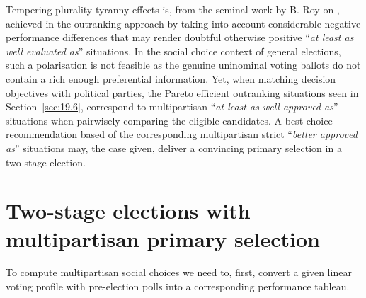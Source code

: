 Tempering plurality tyranny effects is, from the seminal work by B. Roy on \citep{ROY-1966}, achieved in the outranking approach by taking into account considerable negative performance differences that may render doubtful otherwise positive ``\emph{at least as well evaluated as}'' situations. In the social choice context of general elections, such a polarisation is not feasible as the genuine uninominal voting ballots do not contain a rich enough preferential information. Yet, when matching decision objectives with political parties, the Pareto efficient outranking situations seen in Section~\ref{sec:19.6}, correspond to multipartisan ``\emph{at least as well approved as}'' situations when pairwisely comparing the eligible candidates. A best choice recommendation based of the corresponding multipartisan strict ``\emph{better approved as}'' situations may, the case given, deliver a convincing primary selection in a two-stage election. 

\section{Two-stage elections with multipartisan primary selection}
\label{sec:20.1}

To compute multipartisan social choices we need to, first, convert a given linear voting profile with pre-election polls into a corresponding performance tableau.


